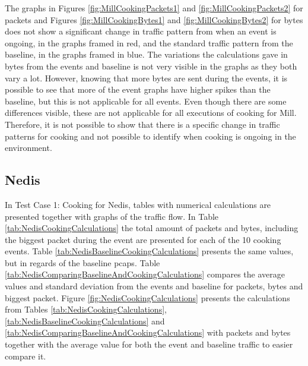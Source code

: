 The graphs in Figures \ref{fig:MillCookingPackets1} and \ref{fig:MillCookingPackets2} for packets and Figures \ref{fig:MillCookingBytes1} and \ref{fig:MillCookingBytes2} for bytes does not show a significant change in traffic pattern from when an event is ongoing, in the graphs framed in red, and the standard traffic pattern from the baseline, in the graphs framed in blue. The variations the calculations gave in bytes from the events and baseline is not very visible in the graphs as they both vary a lot. However, knowing that more bytes are sent during the events, it is possible to see that more of the event graphs have higher spikes than the baseline, but this is not applicable for all events. Even though there are some differences visible, these are not applicable for all executions of cooking for Mill. Therefore, it is not possible to show that there is a specific change in traffic patterns for cooking and not possible to identify when cooking is ongoing in the environment. 

\newpage
\subsection{Nedis}
In Test Case 1: Cooking for Nedis, tables with numerical calculations are presented together with graphs of the traffic flow. In Table \ref{tab:NedisCookingCalculations} the total amount of packets and bytes, including the biggest packet during the event are presented for each of the 10 cooking events. Table \ref{tab:NedisBaselineCookingCalculations} presents the same values, but in regards of the baseline pcaps. Table \ref{tab:NedisComparingBaselineAndCookingCalculations} compares the average values and standard deviation from the events and baseline for packets, bytes and biggest packet. Figure \ref{fig:NedisCookingCalculations} presents the calculations from Tables \ref{tab:NedisCookingCalculations}, \ref{tab:NedisBaselineCookingCalculations} and \ref{tab:NedisComparingBaselineAndCookingCalculations} with packets and bytes together with the average value for both the event and baseline traffic to easier compare it.  

